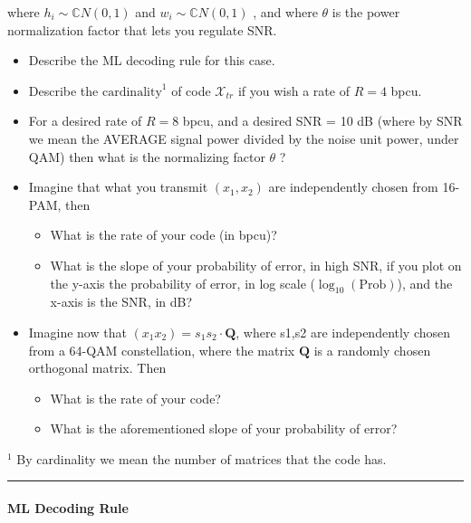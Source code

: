 \documentclass[11pt]{article}
\providecommand{\tightlist}{%
      \setlength{\itemsep}{0pt}\setlength{\parskip}{0pt}}
\begin{document}
where \(h_i \sim \mathbb{C}N(0,1)\) and \(w_i \sim \mathbb{C}N(0,1)\) ,
and where \(\theta\) is the power normalization factor that lets you
regulate SNR.

\begin{itemize}
\tightlist
\item
  Describe the ML decoding rule for this case.
\item
  Describe the \(\text{cardinality}^1\) of code \(\mathcal{X}_{tr}\) if
  you wish a rate of \(R = 4\) bpcu.
\item
  For a desired rate of \(R = 8\) bpcu, and a desired SNR = 10 dB (where
  by SNR we mean the AVERAGE signal power divided by the noise unit
  power, under QAM) then what is the normalizing factor \(\theta\) ?
\item
  Imagine that what you transmit \((x_1,x_2)\) are independently chosen
  from 16-PAM, then

  \begin{itemize}
  \tightlist
  \item
    What is the rate of your code (in bpcu)?
  \item
    What is the slope of your probability of error, in high SNR, if you
    plot on the y-axis the probability of error, in log scale
    (\(\log_{10}(\text{Prob})\)), and the x-axis is the SNR, in dB?
  \end{itemize}
\item
  Imagine now that \(( x_1 x_2 ) = s_1 s_2 \cdot \mathbf{Q}\), where
  s1,s2 are independently chosen from a 64-QAM constellation, where the
  matrix \(\mathbf{Q}\) is a randomly chosen orthogonal matrix. Then

  \begin{itemize}
  \tightlist
  \item
    What is the rate of your code?\\
  \item
    What is the aforementioned slope of your probability of error?
  \end{itemize}
\end{itemize}

\(^1\) By cardinality we mean the number of matrices that the code has.

    \begin{center}\rule{0.5\linewidth}{0.5pt}\end{center}

\paragraph{ML Decoding Rule}\label{ml-decoding-rule}
\end{document}
